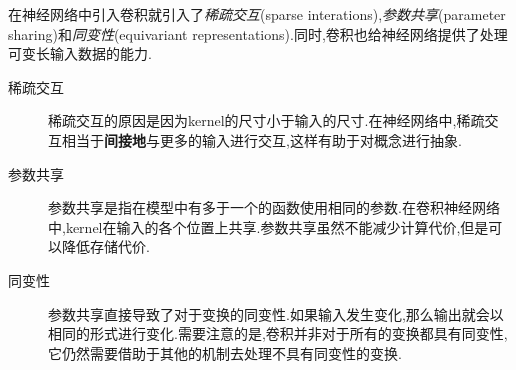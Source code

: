 在神经网络中引入卷积就引入了\textit{稀疏交互}(sparse interations),\textit{参数共享}(parameter sharing)和\textit{同变性}(equivariant representations).同时,卷积也给神经网络提供了处理可变长输入数据的能力.
\begin{description}
    \item [稀疏交互]
    稀疏交互的原因是因为kernel的尺寸小于输入的尺寸.在神经网络中,稀疏交互相当于\textbf{间接地}与更多的输入进行交互,这样有助于对概念进行抽象.
    \item [参数共享]
    参数共享是指在模型中有多于一个的函数使用相同的参数.在卷积神经网络中,kernel在输入的各个位置上共享.参数共享虽然不能减少计算代价,但是可以降低存储代价.
    \item [同变性]
    参数共享直接导致了对于变换的同变性.如果输入发生变化,那么输出就会以相同的形式进行变化.需要注意的是,卷积并非对于所有的变换都具有同变性,它仍然需要借助于其他的机制去处理不具有同变性的变换.
\end{description}